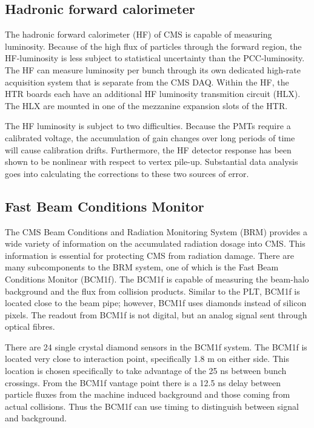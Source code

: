 \subsection{Hadronic forward calorimeter}

The hadronic forward calorimeter (HF) of CMS is capable of measuring luminosity. Because of the high flux of particles through the forward region, the HF-luminosity is less subject to statistical uncertainty than the PCC-luminosity. The HF can measure luminosity per bunch through its own dedicated high-rate acquisition system that is separate from the CMS DAQ. Within the HF, the HTR boards each have an additional HF luminosity transmition circuit (HLX). The HLX are mounted in one of the mezzanine expansion slots of the HTR.

The HF luminosity is subject to two difficulties. Because the PMTs require a calibrated voltage, the accumulation of gain changes over long periods of time will cause calibration drifts. Furthermore, the HF detector response has been shown to be nonlinear with respect to vertex pile-up. Substantial data analysis goes into calculating the corrections to these two sources of error.  

\subsection{Fast Beam Conditions Monitor}

The CMS Beam Conditions and Radiation Monitoring System (BRM) provides a wide variety of information on the accumulated radiation dosage into CMS. This information is essential for protecting CMS from radiation damage. There are many subcomponents to the BRM system, one of which is the Fast Beam Conditions Monitor (BCM1f). The BCM1f is capable of measuring the beam-halo background and the flux from collision products. Similar to the PLT, BCM1f is located close to the beam pipe; however, BCM1f uses diamonds instead of silicon pixels. The readout from BCM1f is not digital, but an analog signal sent through optical fibres. 

There are 24 single crystal diamond sensors in the BCM1f system. The BCM1f is located very close to interaction point, specifically 1.8 m on either side. This location is chosen specifically to take advantage of the 25 ns between bunch crossings. From the BCM1f vantage point there is a 12.5 ns delay between particle fluxes from the machine induced background and those coming from actual collisions. Thus the BCM1f can use timing to distinguish between signal and background.  

